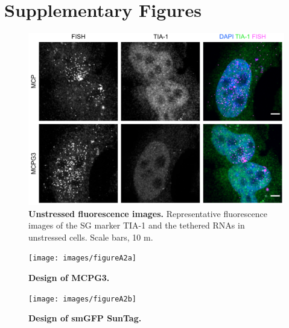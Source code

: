 \chapter{Supplementary Figures}

\begin{figure}[h]
    \centering
    \includegraphics[width=\linewidth]{images/figureA1}
    \caption{\textbf{Unstressed fluorescence images.}
            Representative fluorescence images of the SG marker
            TIA-1 and the tethered RNAs in unstressed cells.
            Scale bars, 10 \textmu m.}
    \label{fig:mcp_supplement}
\end{figure}

\begin{figure}[h]
    \centering
    \texttt{[image: images/figureA2a]}
    \caption{\textbf{Design of MCPG3.}}
    \label{fig:plasmid_1}
\end{figure}

\begin{figure}[h]
    \centering
    \texttt{[image: images/figureA2b]}
    \caption{\textbf{Design of smGFP SunTag.}}
    \label{fig:plasmid_2}
\end{figure}
